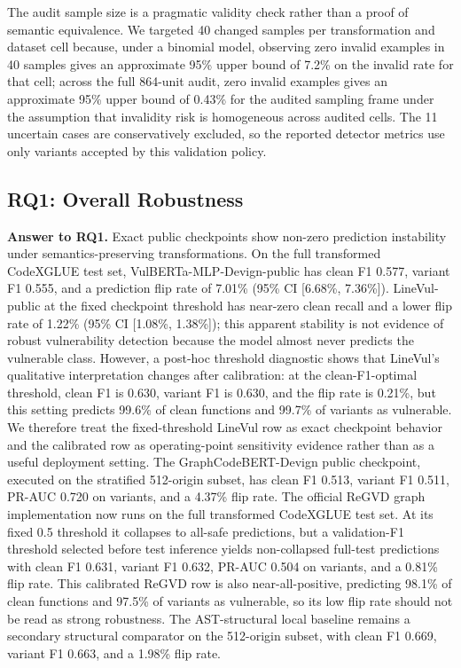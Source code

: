\documentclass[a4paper,fleqn]{cas-dc}
\begin{document}
The audit sample size is a pragmatic validity check rather than a proof of
semantic equivalence. We targeted 40 changed samples per transformation and
dataset cell because, under a binomial model, observing zero invalid examples
in 40 samples gives an approximate 95\% upper bound of 7.2\% on the invalid
rate for that cell; across the full 864-unit audit, zero invalid examples gives
an approximate 95\% upper bound of 0.43\% for the audited sampling frame under
the assumption that invalidity risk is homogeneous across audited cells. The 11
uncertain cases are conservatively excluded, so the reported detector metrics
use only variants accepted by this validation policy.

\subsection{RQ1: Overall Robustness}

\textbf{Answer to RQ1.} Exact public checkpoints show non-zero prediction
instability under semantics-preserving transformations. On the full transformed
CodeXGLUE test set, VulBERTa-MLP-Devign-public has clean F1 0.577,
variant F1 0.555, and a prediction flip rate of 7.01\% (95\% CI [6.68\%,
7.36\%]). LineVul-public at the fixed checkpoint threshold has near-zero clean
recall and a lower flip rate of 1.22\% (95\% CI [1.08\%, 1.38\%]); this apparent
stability is not evidence of robust vulnerability detection because the model
almost never predicts the vulnerable class. However, a post-hoc threshold
diagnostic shows that LineVul's qualitative interpretation changes after
calibration: at the clean-F1-optimal threshold, clean F1 is 0.630, variant F1
is 0.630, and the flip rate is 0.21\%, but this setting predicts 99.6\% of
clean functions and 99.7\% of variants as vulnerable. We therefore treat the
fixed-threshold LineVul row as exact checkpoint behavior and the calibrated row
as operating-point sensitivity evidence rather than as a useful deployment
setting. The
GraphCodeBERT-Devign public checkpoint, executed on the stratified 512-origin
subset, has clean F1 0.513, variant F1 0.511, PR-AUC 0.720 on variants, and a
4.37\% flip rate. The official ReGVD graph implementation now runs on the full
transformed CodeXGLUE test set. At its fixed 0.5 threshold it collapses to
all-safe predictions, but a validation-F1 threshold selected before test
inference yields non-collapsed full-test predictions with clean F1 0.631,
variant F1 0.632, PR-AUC 0.504 on variants, and a 0.81\% flip rate. This
calibrated ReGVD row is also near-all-positive, predicting 98.1\% of clean
functions and 97.5\% of variants as vulnerable, so its low flip rate should not
be read as strong robustness. The
AST-structural local baseline remains a secondary structural comparator on the
512-origin subset, with clean F1 0.669, variant F1 0.663, and a 1.98\% flip
rate.
\end{document}
